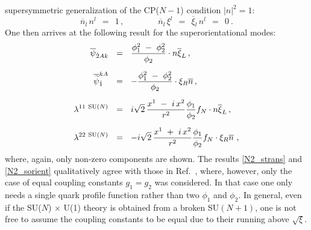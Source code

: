 \documentclass[12pt]{article}
\def\beq{\begin{equation}}
\def\eeq{\end{equation}}
\newcommand{\wt}{\widetilde}
\newcommand{\ov}{\overline}
\newcommand{\sunu}{{\rm SU($N$) $\times$ U(1)} }
\newcommand{\nbar}{\ov{n}}
\begin{document}
	supersymmetric generalization of the CP($N-1$) condition $ |n|^2 = 1 $:
\beq
\label{constr}
	\nbar{}_l\, n^l ~~=~~ 1\,, \qquad\qquad    \nbar_l\, \xi^l  ~~=~~ \ov{\xi}{}_l\, n^l  ~~=~~ 0~.
\eeq
	One then arrives at the following result for the superorientational modes:
\begin{align}
\label{N2_sorient}
%
\notag
\overline{\psi}_{\dot{2}Ak} & ~~=~~ \frac{\phi_1^2 ~-~ \phi_2^2}{\phi_2} \cdot n \overline{\xi}_L  \,,
 \\[2mm]
%
\notag
\overline{\wt{\psi}}_{\dot{1}}^{kA}  & ~~=~~ - \frac{\phi_1^2 ~-~ \phi_2^2}{\phi_2} \cdot \xi_R \nbar \,, \\[2mm]
%
\lambda^{11\ \text{SU($N$)}} & ~~=~~ i \sqrt{2}\, \frac{ x^1 ~-~ i\, x^2 }{r^2} 
						  \frac{\phi_1}{\phi_2} f_N \cdot n \overline{\xi}_L \,,\\[2mm]
%
\notag
\lambda^{22\ \text{SU($N$)}} & ~~=~~ - i \sqrt{2}\, \frac{ x^1 ~+~ i\, x^2 }{r^2} 
						    \frac{\phi_1}{\phi_2} f_N \cdot \xi_R \nbar 
	~,
\end{align}
	where, again, only non-zero components are shown. 
	The results \eqref{N2_strans} and \eqref{N2_sorient} qualitatively agree with those in Ref.~\cite{Edalati},
	where, however, only the case of equal coupling constants $ g_1 = g_2 $ was considered.
	In that case one only needs a single quark profile function rather than two $ \phi_1 $ and $ \phi_2 $.
	In general, even if the \sunu theory is obtained from a broken SU$ (N+1) $, 
	one is not free to assume the coupling constants to be equal due to their running above $ \sqrt{\xi} $.
\end{document}
